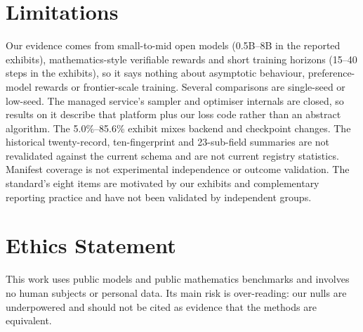 \section*{Limitations}

Our evidence comes from small-to-mid open models (0.5B--8B in the reported exhibits),
mathematics-style verifiable rewards and short training horizons (15--40
steps in the exhibits), so it says nothing about asymptotic behaviour,
preference-model rewards or frontier-scale training. Several comparisons are
single-seed or low-seed. The managed service's sampler and optimiser internals
are closed, so results on it describe that platform plus our loss code rather
than an abstract algorithm. The 5.0\%--85.6\% exhibit mixes backend and
checkpoint changes. The
historical twenty-record, ten-fingerprint and 23-sub-field summaries are not
revalidated against the current schema and are not current registry statistics.
Manifest coverage is not experimental independence or outcome validation.
The standard's eight items are motivated by our exhibits and complementary
reporting practice and have not
been validated by independent groups.

\section*{Ethics Statement}

This work uses public models and public mathematics benchmarks and involves
no human subjects or personal data. Its main risk is over-reading: our nulls
are underpowered and should not be cited as evidence that the methods are
equivalent.

